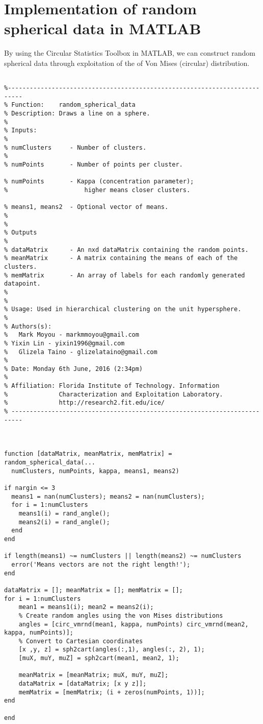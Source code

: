 \documentclass[../tech_report_1.tex]{subfiles}
\begin{document}
\section{Implementation of random spherical data in MATLAB\label{sphere_rand_code}}

By using the Circular Statistics Toolbox in MATLAB, we can construct random spherical data through exploitation of the of Von Mises (circular) distribution.

\begin{verbatim}

%--------------------------------------------------------------------------
% Function:    random_spherical_data
% Description: Draws a line on a sphere.
% 
% Inputs: 
%
% numClusters     - Number of clusters.
%
% numPoints       - Number of points per cluster.

% numPoints       - Kappa (concentration parameter);
%                     higher means closer clusters.

% means1, means2  - Optional vector of means.
%
% 
% Outputs
% 
% dataMatrix      - An nxd dataMatrix containing the random points.
% meanMatrix      - A matrix containing the means of each of the clusters.
% memMatrix       - An array of labels for each randomly generated datapoint.
% 
%
% Usage: Used in hierarchical clustering on the unit hypersphere.
%
% Authors(s):
%   Mark Moyou - markmmoyou@gmail.com
% Yixin Lin - yixin1996@gmail.com
%   Glizela Taino - glizelataino@gmail.com
%
% Date: Monday 6th June, 2016 (2:34pm)
%
% Affiliation: Florida Institute of Technology. Information
%              Characterization and Exploitation Laboratory.
%              http://research2.fit.edu/ice/
% -------------------------------------------------------------------------



function [dataMatrix, meanMatrix, memMatrix] = random_spherical_data(...
  numClusters, numPoints, kappa, means1, means2)

if nargin <= 3
  means1 = nan(numClusters); means2 = nan(numClusters);
  for i = 1:numClusters
    means1(i) = rand_angle();
    means2(i) = rand_angle();
  end
end

if length(means1) ~= numClusters || length(means2) ~= numClusters
  error('Means vectors are not the right length!');
end

dataMatrix = []; meanMatrix = []; memMatrix = [];
for i = 1:numClusters
    mean1 = means1(i); mean2 = means2(i);
    % Create random angles using the von Mises distributions
    angles = [circ_vmrnd(mean1, kappa, numPoints) circ_vmrnd(mean2, kappa, numPoints)];
    % Convert to Cartesian coordinates
    [x ,y, z] = sph2cart(angles(:,1), angles(:, 2), 1);
    [muX, muY, muZ] = sph2cart(mean1, mean2, 1);

    meanMatrix = [meanMatrix; muX, muY, muZ];
    dataMatrix = [dataMatrix; [x y z]];
    memMatrix = [memMatrix; (i + zeros(numPoints, 1))];
end

end
\end{verbatim}
\end{document}
